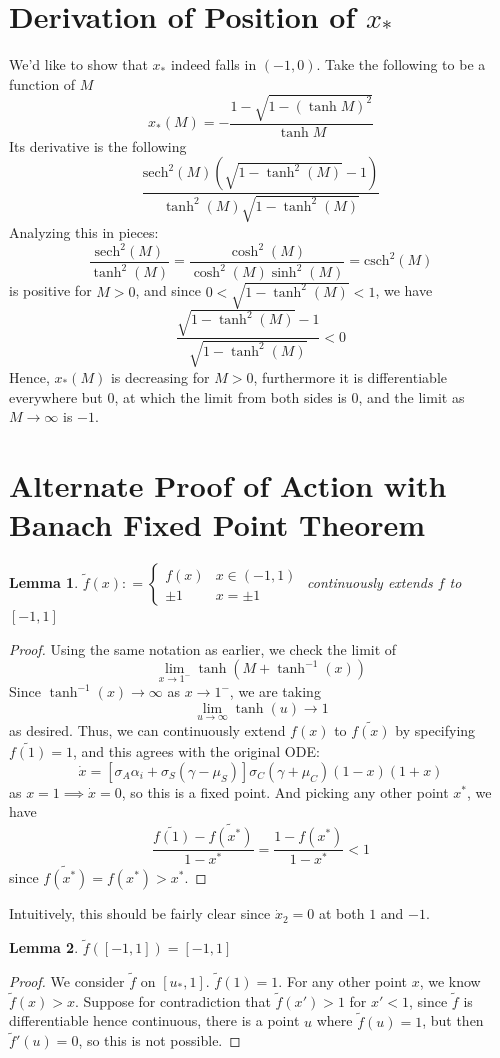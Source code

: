 \documentclass[preprint,12pt]{elsarticle}
\newcommand{\lt}{\left}
\newcommand{\rt}{\right}
\newcommand{\wt}{\widetilde}
\newtheorem{lemma}{Lemma}
\begin{document}
\section{Derivation of Position of $x_*$}
We'd like to show that $x_*$ indeed falls in $(-1,0)$. Take the following to be a function of $M$\[
x_*(M) = -\frac{1  - \sqrt{1 - (\tanh M)^2}}{\tanh M}
\]
Its derivative is the following
\[
\frac{\text{sech}^2(M) \lt(\sqrt{1 - \tanh^{2}(M)} - 1\rt)}{\tanh^2(M) \sqrt{1 - \tanh^{2}(M)}}
\]
Analyzing this in pieces:
\[
\frac{\text{sech}^2(M)}{\tanh^2(M)} = \frac{\cosh^2(M)}{\cosh^2(M)\sinh^2(M)} = \text{csch}^2(M)
\]
is positive for $M > 0$, and since $0 < \sqrt{1 - \tanh^2(M)} < 1$, we have \[
\frac{\sqrt{1 - \tanh^{2}(M)} - 1}{ \sqrt{1 - \tanh^{2}(M)}} < 0
\]
Hence, $x_*(M)$ is decreasing for $M > 0$, furthermore it is differentiable everywhere but 0, at which the limit from both sides is 0, and the limit as $M \to \infty$ is $-1$.

\newpage

\section{Alternate Proof of Action with Banach Fixed Point Theorem}

\begin{lemma}
$\wt f(x) : = \begin{cases}
    f(x)  & x \in (-1,1) \\
    \pm 1 & x = \pm1
\end{cases}$ continuously extends $f$ to $[-1,1]$
\end{lemma}
\begin{proof} Using the same notation as earlier, we check the limit of
\[
\lim_{x \to 1^-} \tanh(M+ \tanh^{-1}(x))
\]
Since $\tanh^{-1}(x) \to \infty$ as $x \to 1^-$, we are taking \[
\lim_{u \to \infty} \tanh(u) \to 1
\]
as desired. Thus, we can continuously extend $f(x)$ to $\wt{f(x)}$ by specifying $\wt{f(1)} = 1$, and this agrees with the original ODE: \[
\dot x = [\sigma_A \alpha_i + \sigma_S(\gamma - \mu_S)] \sigma_C(\gamma + \mu_C)(1-x)(1+x)
\]
as $x = 1 \implies \dot x = 0$, so this is a fixed point. And picking any other point $x^*$, we have \[
\frac{\wt{f(1)} - \wt{f(x^*)}}{1 - x^*} = \frac{1 - f(x^*)}{1- x^*} < 1
\]
since $\wt{f(x^*)} = f(x^*) >x^*$. \end{proof}
Intuitively, this should be fairly clear since $\dot x_2 = 0$ at both $1$ and $-1$.
\begin{lemma}
$\wt f([-1,1]) = [-1,1]$
\end{lemma}
\begin{proof}
We consider $\wt f$ on $[u_*, 1]$. $\wt f(1) = 1$. For any other point $x$, we know $\wt f(x) > x$. Suppose for contradiction that $\wt f(x') > 1$ for $x' < 1$, since $\wt f$ is differentiable hence continuous, there is a point $u$ where $\wt f(u) = 1$, but then $\wt f'(u) = 0$, so this is not possible. \end{proof}
\end{document}
